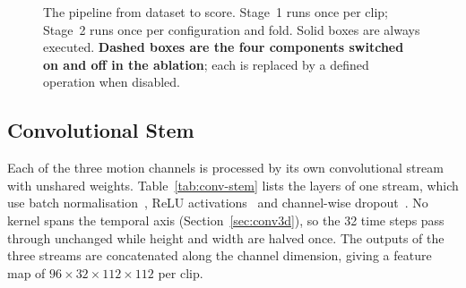 \begin{figure}[H]
	\caption[The data pipeline, end to end]{The pipeline from dataset to score. Stage~1 runs once per clip; Stage~2 runs once per configuration and fold. Solid boxes are always executed. \textbf{Dashed boxes are the four components switched on and off in the ablation}; each is replaced by a defined operation when disabled.}
	\label{fig:pipeline-overview}
\end{figure}

\subsection{Convolutional Stem}
\label{sec:input-streams}
\label{sec:conv-stem}

Each of the three motion channels is processed by its own convolutional stream with unshared weights. Table~\ref{tab:conv-stem} lists the layers of one stream, which use batch normalisation~\cite{ioffe2015}, ReLU activations~\cite{nair2010} and channel-wise dropout~\cite{tompson2015}. No kernel spans the temporal axis (Section~\ref{sec:conv3d}), so the 32 time steps pass through unchanged while height and width are halved once. The outputs of the three streams are concatenated along the channel dimension, giving a feature map of $96\times32\times112\times112$ per clip.

